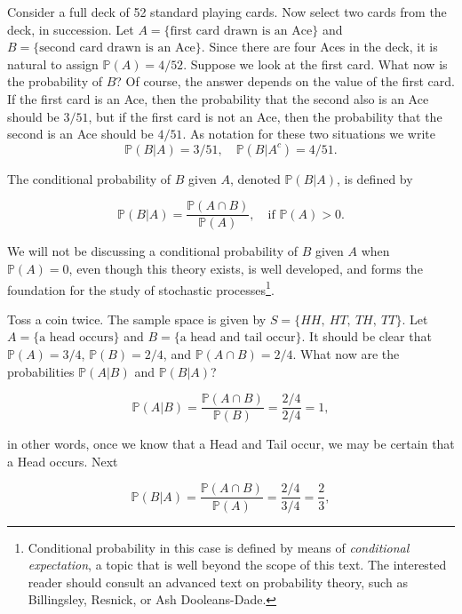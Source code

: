 \documentclass[]{book}
\let\rmarkdownfootnote\footnote%
\def\footnote{\protect\rmarkdownfootnote}
\numberwithin{equation}{chapter}
\numberwithin{figure}{chapter}
\theoremstyle{plain}
\theoremstyle{definition}
\theoremstyle{remark}
\theoremstyle{definition}
\theoremstyle{definition}
\theoremstyle{remark}
\let\BeginKnitrBlock\begin \let\EndKnitrBlock\end
\begin{document}
Consider a full deck of 52 standard playing cards. Now select two cards
from the deck, in succession. Let
\(A = \{ \mbox{first card drawn is an Ace} \}\) and
\(B = \{ \mbox{second card drawn is an Ace} \}\). Since there are four
Aces in the deck, it is natural to assign \(\mathbb{P}(A) = 4/52\).
Suppose we look at the first card. What now is the probability of \(B\)?
Of course, the answer depends on the value of the first card. If the
first card is an Ace, then the probability that the second also is an
Ace should be \(3/51\), but if the first card is not an Ace, then the
probability that the second is an Ace should be \(4/51\). As notation
for these two situations we write \[ 
\mathbb{P}(B\vert A)=3/51,\quad
\mathbb{P}(B\vert A^{c})=4/51.  
\]

\bigskip

\BeginKnitrBlock{definition}
\protect\hypertarget{def:unnamed-chunk-151}{}{\label{def:unnamed-chunk-151}}The
conditional probability of \(B\) given \(A\), denoted
\(\mathbb{P}(B|A)\), is defined by

\begin{equation}
\mathbb{P}(B|A)=\frac{\mathbb{P}(A\cap B)}{\mathbb{P}(A)},\quad \mbox{if }\mathbb{P}(A)>0.
\end{equation}
\EndKnitrBlock{definition}

We will not be discussing a conditional probability of \(B\) given \(A\)
when \(\mathbb{P}(A)=0\), even though this theory exists, is well
developed, and forms the foundation for the study of stochastic
processes\footnote{Conditional probability in this case is defined by
  means of \emph{conditional expectation}, a topic that is well beyond
  the scope of this text. The interested reader should consult an
  advanced text on probability theory, such as Billingsley, Resnick, or
  Ash Dooleans-Dade.}.

Toss a coin twice. The sample space is given by \(S=\{ HH,\ HT,\ TH,\
TT \}\). Let \(A= \{ \mbox{a head occurs} \}\) and
\(B= \{ \mbox{a head and tail occur} \}\). It should be clear that
\(\mathbb{P}(A)=3/4\), \(\mathbb{P}(B)=2/4\), and
\(\mathbb{P}(A\cap B)=2/4\). What now are the probabilities
\(\mathbb{P}(A|B)\) and \(\mathbb{P}(B|A)\)?

\[ \mathbb{P}(A|B)=\frac{\mathbb{P}(A\cap
B)}{\mathbb{P}(B)}=\frac{2/4}{2/4}=1, \]

in other words, once we know that a Head and Tail occur, we may be
certain that a Head occurs. Next

\[ 
\mathbb{P}(B|A)=\frac{\mathbb{P}(A\cap
B)}{\mathbb{P}(A)}=\frac{2/4}{3/4}=\frac{2}{3}, 
\]
\end{document}
